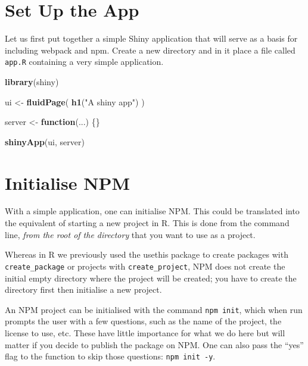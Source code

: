 \documentclass[10pt,]{krantz}
\makeatletter
\newenvironment{Shaded}{\begin{snugshade}}{\end{snugshade}}
\newcommand{\ControlFlowTok}[1]{\textcolor[rgb]{0.27,0.27,0.27}{\textbf{#1}}}
\newcommand{\KeywordTok}[1]{\textcolor[rgb]{0.27,0.27,0.27}{\textbf{#1}}}
\newcommand{\NormalTok}[1]{#1}
\newcommand{\StringTok}[1]{\textcolor[rgb]{0.5,0.5,0.5}{#1}}
\newenvironment{kframe}{%
\medskip{}
\setlength{\fboxsep}{.8em}
 \def\at@end@of@kframe{}%
 \ifinner\ifhmode%
  \def\at@end@of@kframe{\end{minipage}}%
  \begin{minipage}{\columnwidth}%
 \fi\fi%
 \def\FrameCommand##1{\hskip\@totalleftmargin \hskip-\fboxsep
 \colorbox{shadecolor}{##1}\hskip-\fboxsep
     \hskip-\linewidth \hskip-\@totalleftmargin \hskip\columnwidth}%
 \MakeFramed {\advance\hsize-\width
   \@totalleftmargin\z@ \linewidth\hsize
   \@setminipage}}%
 {\par\unskip\endMakeFramed%
 \at@end@of@kframe}
\renewenvironment{Shaded}{\begin{kframe}}{\end{kframe}}
\makeatother
\begin{document}
\hypertarget{webpack-intro-setup}{%
\section{Set Up the App}\label{webpack-intro-setup}}

Let us first put together a simple Shiny application that will serve as a basis for including webpack and npm. Create a new directory and in it place a file called \texttt{app.R} containing a very simple application.

\begin{Shaded}
\begin{Highlighting}[]
\KeywordTok{library}\NormalTok{(shiny)}

\NormalTok{ui <-}\StringTok{ }\KeywordTok{fluidPage}\NormalTok{(}
  \KeywordTok{h1}\NormalTok{(}\StringTok{"A shiny app"}\NormalTok{)}
\NormalTok{)}

\NormalTok{server <-}\StringTok{ }\ControlFlowTok{function}\NormalTok{(...) \{\}}

\KeywordTok{shinyApp}\NormalTok{(ui, server)}
\end{Highlighting}
\end{Shaded}

\hypertarget{webpack-intro-init-npm}{%
\section{Initialise NPM}\label{webpack-intro-init-npm}}

With a simple application, one can initialise NPM. This could be translated into the equivalent of starting a new project in R. This is done from the command line, \emph{from the root of the directory} that you want to use as a project.

Whereas in R we previously used the usethis package to create packages with \texttt{create\_package} or projects with \texttt{create\_project}, NPM does not create the initial empty directory where the project will be created; you have to create the directory first then initialise a new project.

An NPM project can be initialised with the command \texttt{npm\ init}, which when run prompts the user with a few questions, such as the name of the project, the license to use, etc. These have little importance for what we do here but will matter if you decide to publish the package on NPM. One can also pass the ``yes'' flag to the function to skip those questions: \texttt{npm\ init\ -y}.
\end{document}
